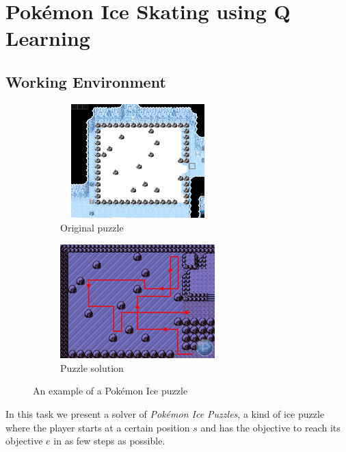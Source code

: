 \renewcommand{\thesection}{Basic Task}

\newcommand{\upa}{\mathlarger{\uparrow}}
\newcommand{\downa}{\mathlarger{\downarrow}}
\newcommand{\lefta}{\mathlarger{\leftarrow}}
\newcommand{\righta}{\mathlarger{\rightarrow}}

\section{Pokémon Ice Skating using Q Learning}

\subsection{Working Environment}

\begin{figure}[h]
	\begin{subfigure}{.49\textwidth}
		\centering
		\includegraphics[width=170pt,height=125pt]{snow_original.png}
		\caption{Original puzzle}
	\end{subfigure}
	\begin{subfigure}{.49\textwidth}
		\centering
		\includegraphics[height=125pt]{snow_2.png}
		\caption{Puzzle solution}
	\end{subfigure}
	\caption{An example of a Pokémon Ice puzzle}
	\label{large_map}
\end{figure}

In this task we present a solver of \emph{Pokémon Ice Puzzles}, a kind of ice puzzle where the player starts at a certain position $s$ and has the objective to reach its objective $e$ in as few steps as possible.

